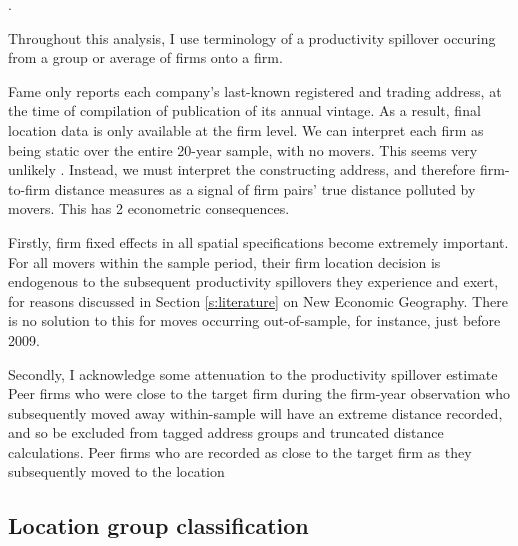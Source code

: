 .
\par
Throughout this analysis, I use terminology of a productivity spillover occuring
from a group or average of  firms onto a  firm.
\par
Fame only reports each company's last-known registered and trading address,
at the time of compilation of publication of its annual vintage.
As a result, final location data is only available at the firm level.
We can interpret each firm as being static over the entire 20-year sample,
with no movers. This seems very unlikely .
Instead, we must interpret the constructing address, and therefore firm-to-firm distance measures
as a signal of firm pairs' true distance polluted by movers.
This has 2 econometric consequences.
\par
Firstly, firm fixed effects in all spatial specifications become extremely important.
For all movers within the sample period, their firm location decision is endogenous to
the subsequent productivity spillovers they experience and exert,
for reasons discussed in Section \ref{s:literature} on New Economic Geography.
There is no solution to this for moves occurring out-of-sample, for instance, just before 2009.
\par
Secondly, I acknowledge some attenuation to the productivity spillover estimate
Peer firms who were close to the target firm during the firm-year observation
who subsequently moved away within-sample will have an extreme distance recorded,
and so be excluded from tagged address groups and truncated distance calculations.
Peer firms who are recorded as close to the target firm as they subsequently moved to the location

\subsection{Location group classification}

